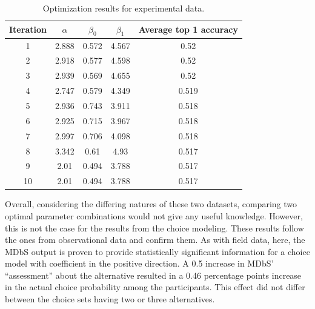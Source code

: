 \documentclass[a4paper,12pt]{article}
\begin{document}
\begin{table}
    \centering
    
    \begin{tabular}{ccccc}
    \hline
    Iteration & $\alpha$ & $\beta_0$ & $\beta_1$ & Average top 1 accuracy\\
    \hline
    1 & 2.888 & 0.572 & 4.567 & 0.52 \\
    2 & 2.918 & 0.577 & 4.598 & 0.52 \\
    3 & 2.939 & 0.569 & 4.655 & 0.52 \\
    4 & 2.747 & 0.579 & 4.349 & 0.519 \\
    5 & 2.936 & 0.743 & 3.911 & 0.518 \\
    6 & 2.925 & 0.715 & 3.967 & 0.518 \\
    7 & 2.997 & 0.706 & 4.098 & 0.518 \\
    8 & 3.342 & 0.61 & 4.93 & 0.517 \\
    9 & 2.01 & 0.494 & 3.788 & 0.517 \\
    10 & 2.01 & 0.494 & 3.788 & 0.517 \\
    \hline
    \end{tabular}
    \caption{Optimization results for experimental data.}
    \label{tab:optimizationNoghuchiResults}
\end{table}


Overall, considering the differing natures of these two datasets, comparing two optimal parameter combinations would not give any useful knowledge. However, this is not the case for the results from the choice modeling. These results follow the ones from observational data and confirm them. As with field data, here, the MDbS output is proven to provide statistically significant information for a choice model with coefficient in the positive direction. A 0.5 increase in MDbS' ``assessment'' about the alternative resulted in a 0.46 percentage points increase in the actual choice probability among the participants. This effect did not differ between the choice sets having two or three alternatives.
\end{document}
